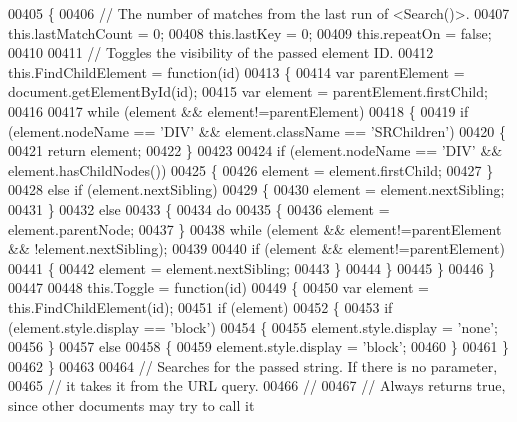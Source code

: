 \begin{DoxyCode}
00405 \{
00406     \textcolor{comment}{// The number of matches from the last run of <Search()>.}
00407     this.lastMatchCount = 0;
00408     this.lastKey = 0;
00409     this.repeatOn = \textcolor{keyword}{false};
00410 
00411     \textcolor{comment}{// Toggles the visibility of the passed element ID.}
00412     this.FindChildElement = \textcolor{keyword}{function}(id)
00413     \{
00414       var parentElement = document.getElementById(\textcolor{keywordtype}{id});
00415       var element = parentElement.firstChild;
00416 
00417       \textcolor{keywordflow}{while} (element && element!=parentElement)
00418       \{
00419         \textcolor{keywordflow}{if} (element.nodeName == \textcolor{stringliteral}{'DIV'} && element.className == \textcolor{stringliteral}{'SRChildren'})
00420         \{
00421           \textcolor{keywordflow}{return} element;
00422         \}
00423 
00424         \textcolor{keywordflow}{if} (element.nodeName == \textcolor{stringliteral}{'DIV'} && element.hasChildNodes())
00425         \{
00426            element = element.firstChild;
00427         \}
00428         \textcolor{keywordflow}{else} \textcolor{keywordflow}{if} (element.nextSibling)
00429         \{
00430            element = element.nextSibling;
00431         \}
00432         \textcolor{keywordflow}{else}
00433         \{
00434           \textcolor{keywordflow}{do}
00435           \{
00436             element = element.parentNode;
00437           \}
00438           \textcolor{keywordflow}{while} (element && element!=parentElement && !element.nextSibling);
00439 
00440           \textcolor{keywordflow}{if} (element && element!=parentElement)
00441           \{
00442             element = element.nextSibling;
00443           \}
00444         \}
00445       \}
00446     \}
00447 
00448     this.Toggle = \textcolor{keyword}{function}(id)
00449     \{
00450       var element = this.FindChildElement(\textcolor{keywordtype}{id});
00451       \textcolor{keywordflow}{if} (element)
00452       \{
00453         \textcolor{keywordflow}{if} (element.style.display == \textcolor{stringliteral}{'block'})
00454         \{
00455           element.style.display = \textcolor{stringliteral}{'none'};
00456         \}
00457         \textcolor{keywordflow}{else}
00458         \{
00459           element.style.display = \textcolor{stringliteral}{'block'};
00460         \}
00461       \}
00462     \}
00463 
00464     \textcolor{comment}{// Searches for the passed string.  If there is no parameter,}
00465     \textcolor{comment}{// it takes it from the URL query.}
00466     \textcolor{comment}{//}
00467     \textcolor{comment}{// Always returns true, since other documents may try to call it}

\end{DoxyCode}
